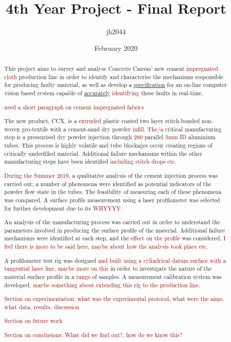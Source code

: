 \documentclass[12pt]{report}
\title{4th Year Project - Final Report}
\author{jh2044}
\date{February 2020}
\newcommand{\tcr}[1]{\textcolor{darkRed}{#1}}
\begin{document}
\maketitle

\begin{abstract}
    This project aims to survey and analyse Concrete Canvas' new cement \tcr{impregnated cloth} production line in order to identify and characterise the mechanisms responsible for producing faulty material, as well as develop a \underline{specification} for an on-line computer vision based system capable of \underline{accurately} \tcr{identifying} these faults in real-time.
    
    \tcr{need a short paragraph on cement impregnated fabrics}
    
    The new product, CCX, is a \tcr{extruded} plastic  coated two layer stitch-bonded non-woven geo-textile with a cement-sand dry powder \tcr{infill}. \tcr{The/a} critical manufacturing step is a pressurised \tcr{dry} powder injection  through \tcr{280} parallel \tcr{5mm ID} aluminium tubes. This process is highly volatile and tube blockages occur creating regions of critically underfilled material. Additional failure mechanisms within the other manufacturing steps have been identified \tcr{including stitch drops etc}.
    
    \tcr{During the Summer 2019}, a qualitative analysis of the cement injection process was carried out; a number of phenomena were identified as potential indicators of the powder flow state in the tubes. The feasibility of measuring each of these phenomena was compared. A surface profile measurement using a laser profilometer was selected for further development due to its \tcr{WHYYYY}.
    
    An analysis of the manufacturing process was carried out in order to understand the parameters involved in producing the surface profile of the material. Additional failure mechanisms were identified at each step, and the \tcr{effect on the profile} was considered. \tcr{I feel there is more to be said here, maybe about how the analysis took place etc}.
    
    A profilometer test rig was designed \tcr{and built} \tcr{using a cylindrical datum surface with a tangential laser line, maybe more on this} in order to investigate the nature of the material surface profile in a \tcr{range} of samples. A measurement calibration system was developed. \tcr{maybe something about extending this rig to the production line}.
    
    \tcr{Section on experimentation: what was the experimental protocol, what were the aims, what data, results, discussion}
    
    \tcr{Section on future work}
    
    \tcr{Section on conclusions: What did we find out?, how do we know this?}
    
    
\end{abstract}
\end{document}

